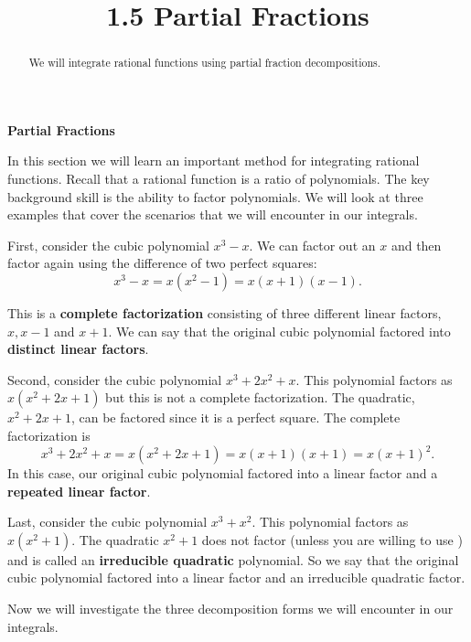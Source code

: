 \documentclass[handout]{ximera}
\title{1.5 Partial Fractions}
\begin{document}
\begin{abstract}
We will integrate rational functions using partial fraction decompositions.
\end{abstract}

\maketitle

\begin{center}
\textbf{Partial Fractions}
\end{center}

In this section we will learn an important method for integrating rational functions.
Recall that a rational function is a ratio of polynomials. The key background skill is the ability to factor polynomials.
We will look at three examples that cover the scenarios that we will encounter in our integrals. 

First, consider the cubic polynomial  $x^3 - x$.  
We can factor out an $x$ and then factor again using the difference of two perfect squares:
\[
x^3 - x = x(x^2-1) = x(x+1)(x-1).
\]

This is a \textbf{complete factorization} consisting of three different linear factors, $x, x-1$ and $x+1$.
We can say that the original cubic polynomial factored into \textbf{distinct linear factors}.

Second, consider the cubic polynomial $x^3 + 2x^2 + x$.  This polynomial factors as $x(x^2 + 2x + 1)$ but this is not a complete factorization. 
The quadratic, $x^2 + 2x + 1$, can be factored since it is a perfect square.  The complete factorization is 
\[
x^3 + 2x^2 + x= x(x^2 + 2x + 1) = x(x+1)(x+1) = x(x+1)^2.
\]
In this case, our original cubic polynomial factored into a linear factor and a \textbf{repeated linear factor}.

Last, consider the cubic polynomial $x^3 + x^2$.  This polynomial factors as $x(x^2 + 1)$.
The quadratic $x^2 + 1$ does not factor (unless you are willing to 
use ) and is called 
an \textbf{irreducible quadratic} polynomial.
So we say that the original cubic polynomial factored into a linear factor and an irreducible quadratic factor.

Now we will investigate the three decomposition forms we will encounter in our integrals.
\end{document}
